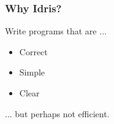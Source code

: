 \begin{frame}[fragile]
\frametitle{Why Idris?}

Write programs that are ...

\begin{itemize}
\item Correct
\item Simple
\item Clear
\end{itemize}

... but perhaps not efficient.

\end{frame}
